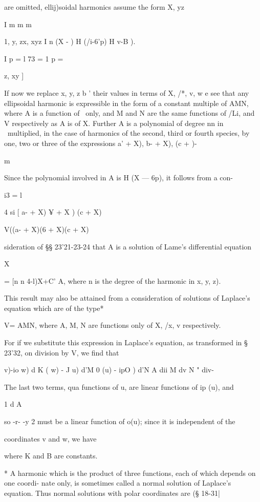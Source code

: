 {{{are omitted, ellij)soidal harmonics assume the form X, yz \

I m m m

1, y, zx, xyz I n (X - ) H (/i-6'p) H v-B ).

I p = l 73 = 1 p = \

z, xy ]

If now we replace x, y, z b ' their values in terms of X, /*, v, w e
see that any ellipsoidal harmonic is expressible in the form of a
constant multiple of AMN, where A is a function of \ only, and M and N
are the same functions of /Li, and V respectively as A is of X.
Further A is a polynomial of degree nn in \ multiplied, in the case of
harmonics of the second, third or fourth species, by one, two or three
of the expressions \/ a' + X), \/ b- + X), \/(c + )-

m

Since the polynomial involved in A is H (X — 6p), it follows from a
con-

i3 = l

4 si [ a- + X) ¥ + X ) (c + X)

V((a- + X)(6 + X)(c + X)

sideration of §§ 23'21-23-24 that A is a solution of Lame's
differential equation

X

= [n n 4-l)X+C' A, where n is the degree of the harmonic in x, y, z).

This result may also be attained from a consideration of solutions of
Laplace's equation which are of the type*

V= AMN, where A, M, N are functions only of X, /x, v respectively.

For if we substitute this expression in Laplace's equation, as
transformed in § 23'32, on division by V, we find that

  v)-io w) d K ( w) - J u) d'M 0 (u) - ipO ) d'N A dii M dv N " div-

The last two terms, qua functions of u, are linear functions of ip
(u), and

1 d A

so -r- -y 2 must be a linear function of o(u); since it is independent
of the

coordinates v and w, we have

where K and B are constants.

* A harmonic which is the product of three functions, each of which
depends on one coordi- nate only, is sometimes called a normal
solution of Laplace's equation. Thus normal solutions with polar
coordinates are (§ 18-31|

}}}
